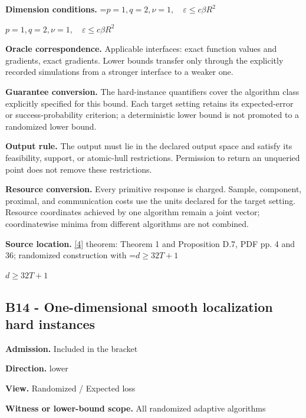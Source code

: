 \documentclass[10pt,a4paper]{article}
\newcommand{\AtlasMath}[1]{\par\begingroup\centering\setbox0=\hbox{$\displaystyle #1$}\ifdim\wd0>1.4\linewidth\typeout{ATLAS WIDE FORMULA: \the\wd0}\fi\ifdim\wd0>\linewidth\resizebox{\linewidth}{!}{\box0}\else\box0\fi\par\endgroup}
\newcommand{\AtlasInlineMath}[1]{\begingroup\setbox0=\hbox{$#1$}\ifdim\wd0>.4\linewidth\endgroup\AtlasMath{#1}\else\endgroup$#1$\fi}
\begin{document}
\textbf{Dimension conditions.} \AtlasInlineMath{p=1,q=2,\nu=1,\quad\varepsilon\le c\beta R^2}



\textbf{Oracle correspondence.} Applicable interfaces: exact function values and gradients, exact gradients. Lower bounds transfer only through the explicitly recorded simulations from a stronger interface to a weaker one.



\textbf{Guarantee conversion.} The hard-instance quantifiers cover the algorithm class explicitly specified for this bound. Each target setting retains its expected-error or success-probability criterion; a deterministic lower bound is not promoted to a randomized lower bound.



\textbf{Output rule.} The output must lie in the declared output space and satisfy its feasibility, support, or atomic-hull restrictions. Permission to return an unqueried point does not remove these restrictions.



\textbf{Resource conversion.} Every primitive response is charged. Sample, component, proximal, and communication costs use the units declared for the target setting. Resource coordinates achieved by one algorithm remain a joint vector; coordinatewise minima from different algorithms are not combined.



\textbf{Source location.} \href{https://arxiv.org/pdf/2609.32910}{[4]} theorem: Theorem 1 and Proposition D.7, PDF pp. 4 and 36; randomized construction with \AtlasInlineMath{d\ge32T+1}



\subsection{B14 - One-dimensional smooth localization hard instances}


\textbf{Admission.} Included in the bracket



\textbf{Direction.} lower



\textbf{View.} Randomized / Expected loss



\textbf{Witness or lower-bound scope.} All randomized adaptive algorithms
\end{document}
